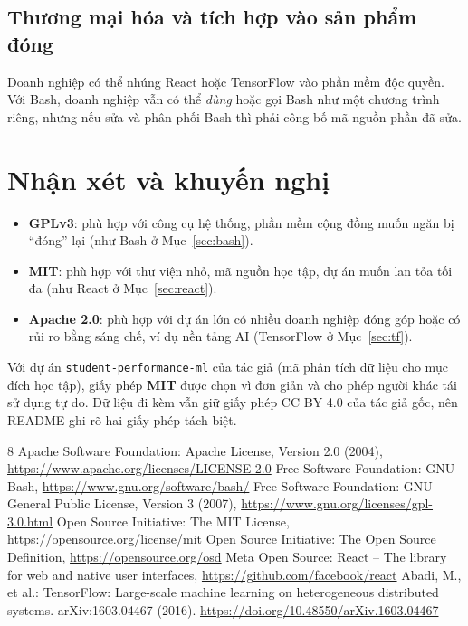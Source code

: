 \documentclass[runningheads]{llncs}
\begin{document}
\subsection{Thương mại hóa và tích hợp vào sản phẩm đóng}
Doanh nghiệp có thể nhúng React hoặc TensorFlow vào phần mềm độc quyền. Với Bash, doanh nghiệp vẫn
có thể \emph{dùng} hoặc gọi Bash như một chương trình riêng, nhưng nếu sửa và phân phối Bash thì
phải công bố mã nguồn phần đã sửa.

\section{Nhận xét và khuyến nghị}\label{sec:recommend}
\begin{itemize}
  \item \textbf{GPLv3}: phù hợp với công cụ hệ thống, phần mềm cộng đồng muốn ngăn bị ``đóng''
        lại (như Bash ở Mục~\ref{sec:bash}).
  \item \textbf{MIT}: phù hợp với thư viện nhỏ, mã nguồn học tập, dự án muốn lan tỏa tối đa
        (như React ở Mục~\ref{sec:react}).
  \item \textbf{Apache 2.0}: phù hợp với dự án lớn có nhiều doanh nghiệp đóng góp hoặc có rủi ro
        bằng sáng chế, ví dụ nền tảng AI (TensorFlow ở Mục~\ref{sec:tf}).
\end{itemize}
Với dự án \texttt{student-performance-ml} của tác giả (mã phân tích dữ liệu cho mục đích học tập),
giấy phép \textbf{MIT} được chọn vì đơn giản và cho phép người khác tái sử dụng tự do. Dữ liệu đi
kèm vẫn giữ giấy phép CC BY 4.0 của tác giả gốc, nên README ghi rõ hai giấy phép tách biệt.

\begin{thebibliography}{8}
 Apache Software Foundation: Apache License, Version 2.0 (2004),
  \url{https://www.apache.org/licenses/LICENSE-2.0}
 Free Software Foundation: GNU Bash, \url{https://www.gnu.org/software/bash/}
 Free Software Foundation: GNU General Public License, Version 3 (2007),
  \url{https://www.gnu.org/licenses/gpl-3.0.html}
 Open Source Initiative: The MIT License, \url{https://opensource.org/license/mit}
 Open Source Initiative: The Open Source Definition,
  \url{https://opensource.org/osd}
 Meta Open Source: React – The library for web and native user interfaces,
  \url{https://github.com/facebook/react}
 Abadi, M., et al.: TensorFlow: Large-scale machine learning on heterogeneous
  distributed systems. arXiv:1603.04467 (2016). \url{https://doi.org/10.48550/arXiv.1603.04467}
\end{thebibliography}
\end{document}

